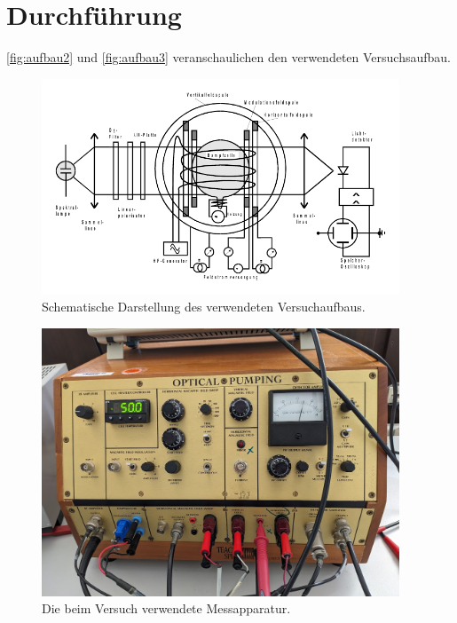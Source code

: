 \section{Durchführung}
\label{sec:Durchführung}

\autoref{fig:aufbau2} und \autoref{fig:aufbau3} veranschaulichen den verwendeten Versuchsaufbau.
\begin{figure}
    \centering
    \includegraphics[width=0.95\textwidth]{pictures/Aufbau2.pdf}
    \caption{Schematische Darstellung des verwendeten Versuchaufbaus. \cite{v21}}
    \label{fig:aufbau2}
\end{figure} 

\begin{figure}
    \centering
    \includegraphics[width=0.95\textwidth]{pictures/Aufbau3.jpg}
    \caption{Die beim Versuch verwendete Messapparatur.}
    \label{fig:aufbau3}
\end{figure} 

